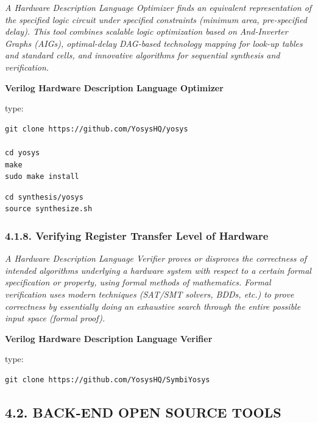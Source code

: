 \documentclass[
]{article}
\begin{document}
\emph{A Hardware Description Language Optimizer finds an equivalent
representation of the specified logic circuit under specified
constraints (minimum area, pre-specified delay). This tool combines
scalable logic optimization based on And-Inverter Graphs (AIGs),
optimal-delay DAG-based technology mapping for look-up tables and
standard cells, and innovative algorithms for sequential synthesis and
verification.}

\textbf{Verilog Hardware Description Language Optimizer}

type:

\begin{verbatim}
git clone https://github.com/YosysHQ/yosys

cd yosys
make
sudo make install
\end{verbatim}

\begin{verbatim}
cd synthesis/yosys
source synthesize.sh
\end{verbatim}

\hypertarget{verifying-register-transfer-level-of-hardware-1}{%
\subsubsection{4.1.8. Verifying Register Transfer Level of
Hardware}\label{verifying-register-transfer-level-of-hardware-1}}

\emph{A Hardware Description Language Verifier proves or disproves the
correctness of intended algorithms underlying a hardware system with
respect to a certain formal specification or property, using formal
methods of mathematics. Formal verification uses modern techniques
(SAT/SMT solvers, BDDs, etc.) to prove correctness by essentially doing
an exhaustive search through the entire possible input space (formal
proof).}

\textbf{Verilog Hardware Description Language Verifier}

type:

\begin{verbatim}
git clone https://github.com/YosysHQ/SymbiYosys
\end{verbatim}

\hypertarget{back-end-open-source-tools-2}{%
\subsection{4.2. BACK-END OPEN SOURCE
TOOLS}\label{back-end-open-source-tools-2}}
\end{document}

